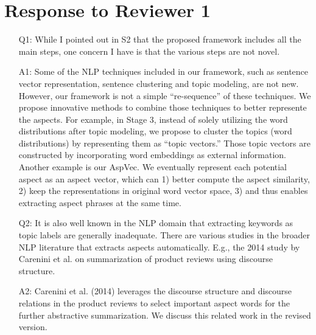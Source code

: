 \section{Response to Reviewer 1}
\begin{itemize}
	\item [Q1:] 
While I pointed out in S2 that the proposed framework includes all the main steps, one concern I have is that the various steps are not novel.

\item [A1:] Some of the NLP techniques included in our framework, 
such as sentence vector representation, sentence clustering and 
topic modeling, are not new. However, our framework is not a simple 
``re-sequence'' of these techniques. We propose innovative methods to 
combine those techniques to better represente the aspects. 
For example, in Stage 3, instead of solely utilizing the word distributions 
after topic modeling, we propose to cluster the topics (word distributions) 
by representing them as ``topic vectors.'' Those topic vectors are 
constructed by incorporating word embeddings as external information.  
Another example is our AspVec. We eventually represent each potential aspect 
as an aspect vector, which can 1) better compute the aspect similarity,  
2) keep the representations in original word vector space,  
3) and thus enables extracting aspect phrases at the same time.
	
\item [Q2:] 
It is also well known in the NLP domain that extracting keywords as topic labels are generally inadequate. There are various studies in the broader NLP literature that extracts aspects automatically. E.g., the 2014 study by Carenini et al. on summarization of product reviews using discourse structure. 
\item [A2:] Carenini et al. (2014) leverages the discourse structure and 
discourse relations in the product reviews to select important aspect words 
for the further abstractive summarization. We discuss this related work in 
the revised version.
	

\end{itemize}
